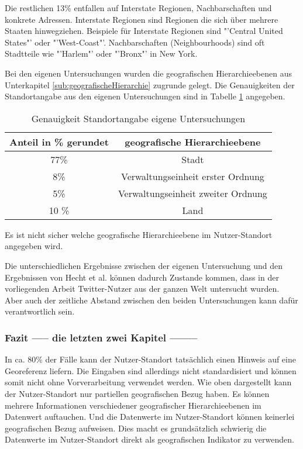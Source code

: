 				Die restlichen 13\% entfallen auf Interstate Regionen, Nachbarschaften und konkrete Adressen. 
				Interstate Regionen sind Regionen die sich über mehrere Staaten hinwegziehen. 
				Beispiele für Interstate Regionen sind "'Central United States"' oder "'West-Coast"'.
				Nachbarschaften (Neighbourhoods) sind oft Stadtteile wie "'Harlem"' oder "'Bronx"' in New York.

				Bei den eigenen Untersuchungen wurden die geografischen Hierarchieebenen aus Unterkapitel \ref{sub:geografischeHierarchie} zugrunde gelegt.
				Die Genauigkeiten der Standortangabe aus den eigenen Untersuchungen sind in Tabelle \ref{tab:genauigkeitenEigene} angegeben.

				\begin{table}[htpb]
				\caption{Genauigkeit Standortangabe eigene Untersuchungen} 
				\centering
				\begin{tabular}{|c||c|}
					\hline
					Anteil in \% gerundet & geografische Hierarchieebene \\
					\hline\hline
					77\% & Stadt \\
					\hline
					8\% & Verwaltungseinheit erster Ordnung  \\
					\hline
					5\% & Verwaltungseinheit zweiter Ordnung  \\
					\hline
					10 \% & Land \\
					\hline
				\end{tabular}
				\label{tab:genauigkeitenEigene} 
				\end{table} 

				Es ist nicht sicher welche geografische Hierarchieebene im Nutzer-Standort angegeben wird. 

				Die unterschiedlichen Ergebnisse zwischen der eigenen Untersuchung und den Ergebnissen von Hecht et al. können dadurch Zustande kommen, dass in der vorliegenden Arbeit Twitter-Nutzer aus der ganzen Welt untersucht wurden.
				Aber auch der zeitliche Abstand zwischen den beiden Untersuchungen kann dafür verantwortlich sein.  

			\subsubsection{Fazit ----- die letzten zwei Kapitel --------} 

				In ca. 80\% der Fälle kann der Nutzer-Standort tatsächlich einen Hinweis auf eine Georeferenz liefern.
				Die Eingaben sind allerdings nicht standardisiert und können somit nicht ohne Vorverarbeitung verwendet werden.
				Wie oben dargestellt kann der Nutzer-Standort nur partiellen geografischen Bezug haben.
				Es können mehrere Informationen verschiedener geografischer Hierarchieebenen im Datenwert auftauchen. 
				Und die Datenwerte im Nutzer-Standort können keinerlei geografischen Bezug aufweisen.
				Dies macht es grundsätzlich schwierig die Datenwerte im Nutzer-Standort direkt als geografischen Indikator zu verwenden.
				
